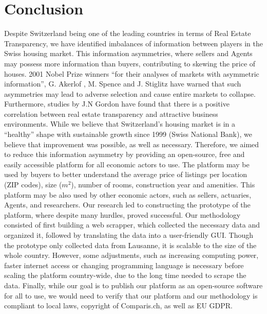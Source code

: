 \documentclass[main]{subfiles}
\begin{document}
\section{Conclusion}
Despite Switzerland being one of the leading countries in terms of Real Estate Transparency, 
we have identified imbalances of information between players in the Swiss housing market. 
This information asymmetries, where sellers and Agents may possess more information than buyers, contributing to skewing the price of houses. 
2001 Nobel Prize winners “for their analyses of markets with asymmetric information”, G. Akerlof 
\cite{akerlofMarketLemonsQuality1970}, 
M. Spence \cite{spenceInformationalAspectsMarket1976} and 
J. Stiglitz \cite{stiglitzAsymmetricInformationCredit1992} 
have warned that such asymmetries may lead to adverse selection and cause entire markets to collapse. 
Furthermore, studies by J.N Gordon have found that there is a positive correlation between real estate transparency 
and attractive business environments. While we believe that Switzerland's housing market is in a “healthy” 
shape with sustainable growth since 1999 (Swiss National Bank), we believe that improvement was possible, 
as well as necessary.
Therefore, we aimed to reduce this information asymmetry by providing an open-source, free and easily accessible 
platform for all economic actors to use. The platform may be used by buyers to better understand the 
average price of listings per location (ZIP codes), size ($m^{2}$), number of rooms, construction year and amenities. 
This platform may be also used by other economic actors, such as sellers, actuaries, Agents, and researchers.
Our research led to constructing the prototype of the platform, where despite many hurdles, proved successful. 
Our methodology consisted of first building a web scrapper, which collected the necessary data and organized it, 
followed by translating the data into a user-friendly GUI. Though the prototype only collected data from Lausanne, 
it is scalable to the size of the whole country. However, some adjustments, such as increasing computing power, 
faster internet access or changing programming language is necessary before scaling the platform country-wide, 
due to the long time needed to scrape the data. 
Finally, while our goal is to publish our platform as an open-source software for all to use, we would need 
to verify that our platform and our methodology is compliant to local laws, copyright of Comparis.ch, as well as EU GDPR.
\end{document}
